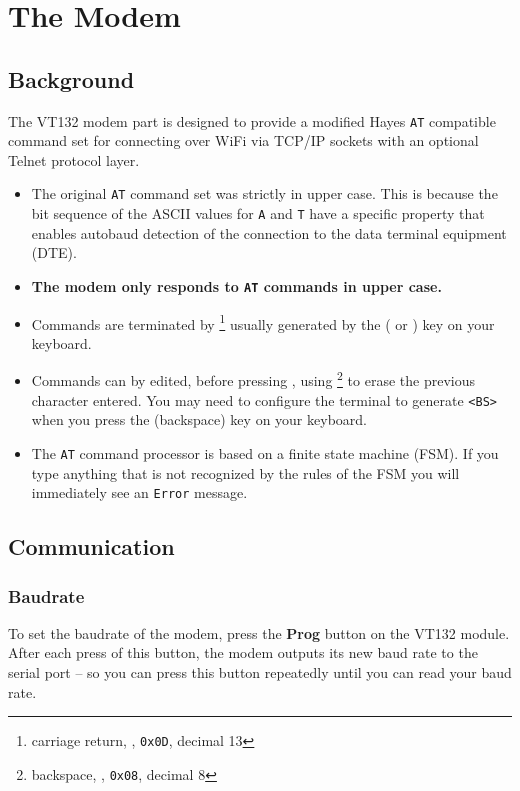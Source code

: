 \chapter{The Modem}

\section{Background}

The VT132 modem part is designed to provide a modified Hayes \texttt{AT} compatible command set for connecting over WiFi via TCP/IP
sockets with an optional Telnet protocol layer.

\begin{itemize}
	\item The original \texttt{AT} command set was strictly in upper case. This is because the bit sequence of the ASCII values for \texttt{A} and \texttt{T} have
		a specific property that enables autobaud detection of the connection to the data terminal equipment (DTE).
	\item \textbf{The modem only responds to \texttt{AT} commands in upper case.}
	\item Commands are terminated by \LKeyEnter \footnote{carriage return, , \texttt{0x0D}, decimal 13} usually generated by the \LKeyEnter{}
		( or ) key on your keyboard.
	\item Commands can by edited, before pressing \LKeyEnter, using \LKeyBack \footnote{backspace, , \texttt{0x08}, decimal 8} to erase the previous
		character entered. You may need to configure the terminal to generate \texttt{<BS>} when you press the \LKeyBack{} (backspace) key on your keyboard.
	\item The \texttt{AT} command processor is based on a finite state machine (FSM). If you type anything that is not recognized by the rules of the 
		FSM you will immediately see an \texttt{Error} message.
\end{itemize}

\section{Communication}

\subsection{Baudrate}

To set the baudrate of the modem, press the \textbf{Prog} button on the VT132 module. After each press of this button, the modem outputs its new
baud rate to the serial port -- so you can press this button repeatedly until you can read your baud rate.

